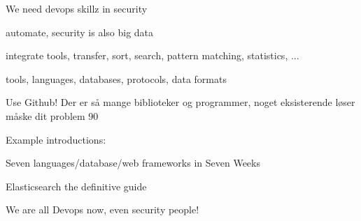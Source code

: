 \documentclass[20pt,landscape,a4paper,footrule]{foils}
\begin{document}

\begin{list1}
\item We need devops skillz in security
\item automate, security is also big data
\item integrate tools, transfer, sort, search, pattern matching, statistics, ...
\item tools, languages, databases, protocols, data formats
\item Use Github! Der er så mange biblioteker og programmer, noget eksisterende løser måske dit problem 90%
\item Example introductions:
\begin{list2}
\item Seven languages/database/web frameworks in Seven Weeks
\item Elasticsearch the definitive guide
\end{list2}
\end{list1}

\centerline{We are all Devops now, even security people!}

\myquestionspage
\end{document}

